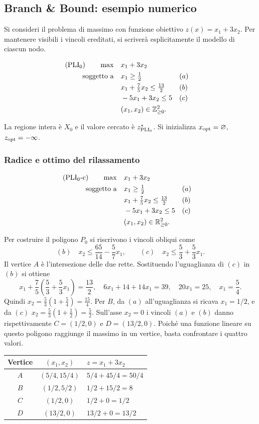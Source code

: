 \subsection{Branch \& Bound: esempio numerico}

Si consideri il problema di massimo con funzione obiettivo
$z(x)=x_1+3x_2$. Per mantenere visibili i vincoli ereditati, si scriverà
esplicitamente il modello di ciascun nodo.

\newcommand{\BBmodello}[3]{%
 \[
 \begin{aligned}
 (#1)\qquad \max\quad &x_1+3x_2\\
 \text{soggetto a}\quad &x_1\geq\tfrac12 &&(a)\\
 &x_1+\tfrac75x_2\leq\tfrac{13}{2} &&(b)\\
 &-5x_1+3x_2\leq5 &&(c)\\
 #2
 &(x_1,x_2)\in #3.
 \end{aligned}
 \]}
\newcommand{\BBdestra}{&x_1\geq2 &&(d')\\}
\newcommand{\BBbasso}{&x_2\leq3 &&(e)\\}

\BBmodello{\BBpli{0}}{}{\mathbb Z_{\geq0}^2}

La regione intera è $X_0$ e il valore cercato è $z^*_{\mathrm{PLI}_{0}}$.
Si inizializza $x_{\mathrm{opt}}=\varnothing$, $z_{\mathrm{opt}}=-\infty$.

\subsubsection{Radice e ottimo del rilassamento}

\BBmodello{\BBrel{0}}{}{\mathbb R_{\geq0}^2}

Per costruire il poligono $P_0$ si riscrivono i vincoli obliqui come
\[
 (b)\quad x_2\leq\frac{65}{14}-\frac57x_1,
 \qquad
 (c)\quad x_2\leq\frac53+\frac53x_1.
\]
Il vertice $A$ è l'intersezione delle due rette. Sostituendo l'uguaglianza
di $(c)$ in $(b)$ si ottiene
\[
 x_1+\frac75\left(\frac53+\frac53x_1\right)=\frac{13}{2},
 \quad 6x_1+14+14x_1=39,
 \quad 20x_1=25,
 \quad x_1=\frac54.
\]
Quindi $x_2=\tfrac53(1+\tfrac54)=\tfrac{15}{4}$.
Per $B$, da $(a)$ all'uguaglianza si ricava $x_1=1/2$, e da $(c)$
$x_2=\tfrac53(1+\tfrac12)=\tfrac52$. Sull'asse $x_2=0$ i vincoli
$(a)$ e $(b)$ danno rispettivamente $C=(1/2,0)$ e $D=(13/2,0)$.
Poiché una funzione lineare su questo poligono raggiunge il massimo in
un vertice, basta confrontare i quattro valori.

\begin{center}
\begin{tabular}{c c l}
\hline
Vertice & $(x_1,x_2)$ & $z=x_1+3x_2$\\
\hline
$A$ & $(5/4,15/4)$ & $5/4+45/4=50/4$\\
$B$ & $(1/2,5/2)$   & $1/2+15/2=8$\\
$C$ & $(1/2,0)$     & $1/2+0=1/2$\\
$D$ & $(13/2,0)$    & $13/2+0=13/2$\\
\hline
\end{tabular}
\end{center}

